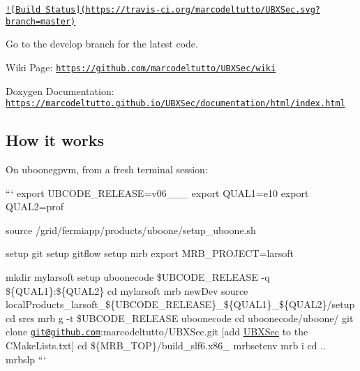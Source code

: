 \href{https://travis-ci.org/marcodeltutto/UBXSec}{\tt !\mbox{[}Build Status\mbox{]}(https\-://travis-\/ci.\-org/marcodeltutto/\-U\-B\-X\-Sec.\-svg?branch=master)}

Go to the develop branch for the latest code.

Wiki Page\-: \href{https://github.com/marcodeltutto/UBXSec/wiki}{\tt https\-://github.\-com/marcodeltutto/\-U\-B\-X\-Sec/wiki}

Doxygen Documentation\-: \href{https://marcodeltutto.github.io/UBXSec/documentation/html/index.html}{\tt https\-://marcodeltutto.\-github.\-io/\-U\-B\-X\-Sec/documentation/html/index.\-html}

\subsection*{How it works}

On uboonegpvm, from a fresh terminal session\-:

``` export U\-B\-C\-O\-D\-E\-\_\-\-R\-E\-L\-E\-A\-S\-E=v06\-\_\-\_\-\_ export Q\-U\-A\-L1=e10 export Q\-U\-A\-L2=prof

source /grid/fermiapp/products/uboone/setup\-\_\-uboone.sh

setup git setup gitflow setup mrb export M\-R\-B\-\_\-\-P\-R\-O\-J\-E\-C\-T=larsoft

mkdir mylarsoft setup uboonecode \$\-U\-B\-C\-O\-D\-E\-\_\-\-R\-E\-L\-E\-A\-S\-E -\/q \$\{Q\-U\-A\-L1\}\-:\$\{Q\-U\-A\-L2\} cd mylarsoft mrb new\-Dev source local\-Products\-\_\-larsoft\-\_\-\$\{U\-B\-C\-O\-D\-E\-\_\-\-R\-E\-L\-E\-A\-S\-E\}\-\_\-\$\{Q\-U\-A\-L1\}\-\_\-\$\{Q\-U\-A\-L2\}/setup cd srcs mrb g -\/t \$\-U\-B\-C\-O\-D\-E\-\_\-\-R\-E\-L\-E\-A\-S\-E uboonecode cd uboonecode/uboone/ git clone \href{mailto:git@github.com}{\tt git@github.\-com}\-:marcodeltutto/\-U\-B\-X\-Sec.\-git \mbox{[}add \hyperlink{classUBXSec}{U\-B\-X\-Sec} to the C\-Make\-Lists.\-txt\mbox{]} cd \$\{M\-R\-B\-\_\-\-T\-O\-P\}/build\-\_\-slf6.x86\-\_ mrbsetenv mrb i cd .. mrbslp ``` 